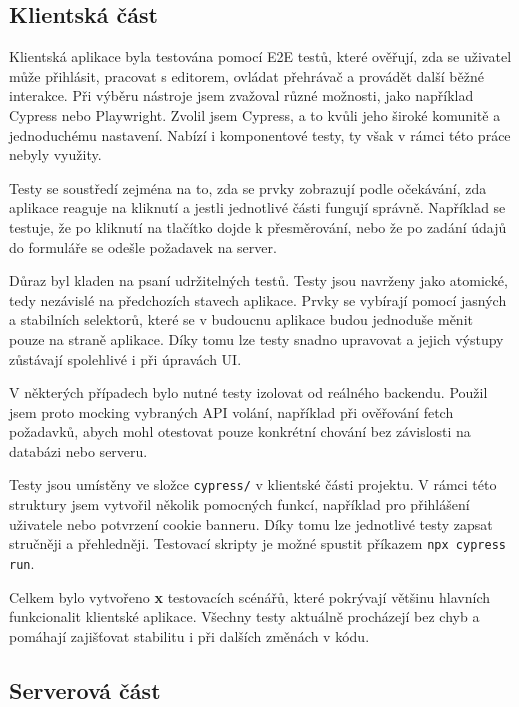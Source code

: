 \subsection{Klientská část}

Klientská aplikace byla testována pomocí E2E testů, které ověřují, zda se uživatel může přihlásit, pracovat s editorem, ovládat přehrávač a provádět další běžné interakce. 
Při výběru nástroje jsem zvažoval různé možnosti, jako například Cypress nebo Playwright. 
Zvolil jsem Cypress, a to kvůli jeho široké komunitě a jednoduchému nastavení.
Nabízí i komponentové testy, ty však v rámci této práce nebyly využity.

Testy se soustředí zejména na to, zda se prvky zobrazují podle očekávání, zda aplikace reaguje na kliknutí a jestli jednotlivé části fungují správně.
Například se testuje, že po kliknutí na tlačítko dojde k přesměrování, nebo že po zadání údajů do formuláře se odešle požadavek na server.

Důraz byl kladen na psaní udržitelných testů. 
Testy jsou navrženy jako atomické, tedy nezávislé na předchozích stavech aplikace. 
Prvky se vybírají pomocí jasných a stabilních selektorů, které se v budoucnu aplikace budou jednoduše měnit pouze na straně aplikace.
Díky tomu lze testy snadno upravovat a jejich výstupy zůstávají spolehlivé i při úpravách UI.

V některých případech bylo nutné testy izolovat od reálného backendu.
Použil jsem proto mocking vybraných API volání, například při ověřování fetch požadavků, abych mohl otestovat pouze konkrétní chování bez závislosti na databázi nebo serveru.

Testy jsou umístěny ve složce \texttt{cypress/} v klientské části projektu. 
V rámci této struktury jsem vytvořil několik pomocných funkcí, například pro přihlášení uživatele nebo potvrzení cookie banneru. 
Díky tomu lze jednotlivé testy zapsat stručněji a přehledněji.
Testovací skripty je možné spustit příkazem \verb|npx cypress run|.

Celkem bylo vytvořeno \textbf{x} testovacích scénářů, které pokrývají většinu hlavních funkcionalit klientské aplikace. 
Všechny testy aktuálně procházejí bez chyb a pomáhají zajišťovat stabilitu i při dalších změnách v kódu.

\subsection{Serverová část}

